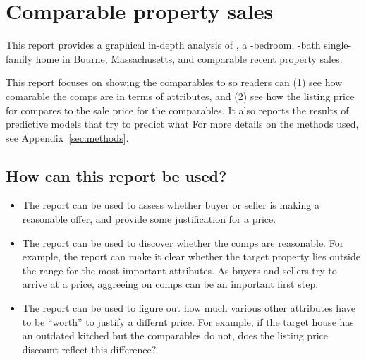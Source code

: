 \documentclass[
12pt, %
letterpaper, %
oneside, %
headinclude,footinclude, %
BCOR5mm, %
]{scrartcl}
\begin{document}


\section{Comparable property sales}
This report provides a graphical in-depth analysis of 
\newline \textbf{\PropertyName{}}, 
a \NumberOfBedrooms{}-bedroom, \NumberOfBaths-bath 
single-family home %
in Bourne, Massachusetts, %
and \NumberOfComps{} comparable recent property sales:



This report focuses on showing the comparables to \PropertyName{} so readers can (1) see how comarable the comps are in terms of attributes, and (2) see how the listing price for \PropertyName{} compares to the sale price for the comparables.   
It also reports the results of predictive models that try to predict what
For more details on the methods used, see Appendix~\ref{sec:methods}.

\subsection{How can this report be used?}
\begin{itemize}
\item The report can be used to assess whether buyer or seller is making a reasonable offer, and provide some justification for a price. 
\item The report can be used to discover whether the comps are reasonable. For example, the report can make it clear whether the target property lies outside the range for the most important attributes. As buyers and sellers try to arrive at a price, aggreeing on comps can be an important first step. 
\item The report can be used to figure out how much various other attributes have to be ``worth'' to justify a differnt price. For example, if the target house has an outdated kitched but the comparables do not, does the listing price discount reflect this difference? 
\end{itemize} 
\end{document}
